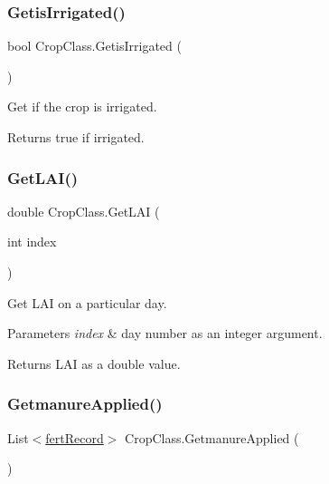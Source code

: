 \subsubsection{\texorpdfstring{GetisIrrigated()}{GetisIrrigated()}}
{\footnotesize\ttfamily bool Crop\+Class.\+Getis\+Irrigated (\begin{DoxyParamCaption}{ }\end{DoxyParamCaption})\hspace{0.3cm}{\ttfamily [inline]}}



Get if the crop is irrigated. 

\begin{DoxyReturn}{Returns}
true if irrigated. 
\end{DoxyReturn}
\mbox{\label{class_crop_class_ac921e5d0df8c03bb12ef9113cb27337d}} 
\subsubsection{\texorpdfstring{GetLAI()}{GetLAI()}}
{\footnotesize\ttfamily double Crop\+Class.\+Get\+L\+AI (\begin{DoxyParamCaption}\item[{int}]{index }\end{DoxyParamCaption})\hspace{0.3cm}{\ttfamily [inline]}}



Get L\+AI on a particular day. 


\begin{DoxyParams}{Parameters}
{\em index} & day number as an integer argument. \\
\hline
\end{DoxyParams}
\begin{DoxyReturn}{Returns}
L\+AI as a double value. 
\end{DoxyReturn}
\mbox{\label{class_crop_class_af9ecdb2d77c3a4fd83adf11943080076}} 
\subsubsection{\texorpdfstring{GetmanureApplied()}{GetmanureApplied()}}
{\footnotesize\ttfamily List$<$\mbox{\hyperlink{classfert_record}{fert\+Record}}$>$ Crop\+Class.\+Getmanure\+Applied (\begin{DoxyParamCaption}{ }\end{DoxyParamCaption})\hspace{0.3cm}{\ttfamily [inline]}}



